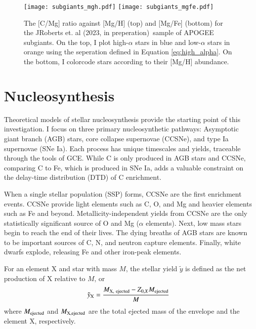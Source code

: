 \documentclass[12pt,oneside]{report}
\newcommand{\citetjack}{JRoberts et. al (2023, in preperation)}
\begin{document}
\begin{figure}[htp]
    \texttt{[image: subgiants\_mgh.pdf]}
    \texttt{[image: subgiants\_mgfe.pdf]}
    \caption[APOGEE Subgiants]{The [C/Mg] ratio against [Mg/H] (top) and [Mg/Fe] (bottom) for the \citetjack~sample of APOGEE subgiants. On the top, I plot high-$\alpha$ stars in blue and low-$\alpha$ stars in orange using the seperation defined in Equation \ref{eq:high_alpha}. On the bottom, I colorcode stars according to their [Mg/H] abundance.}
    \label{fig:subgiants}
\end{figure}
\chapter{Nucleosynthesis}

Theoretical models of stellar nucleosynthesis provide the starting point of this investigation. I focus on three primary nucleosynthetic pathways: Asymptotic giant branch (AGB) stars, core collapse supernovae (CCSNe), and type Ia supernovae (SNe Ia). Each process has unique timescales and yields, traceable through the tools of GCE. While C is only produced in AGB stars and CCSNe, comparing C to Fe, which is produced in SNe Ia, adds a valuable constraint on the delay-time distribution (DTD) of C enrichment.

When a single stellar population (SSP) forms, CCSNe are the first enrichment events. CCSNe provide light elements such as C, O, and Mg and heavier elements such as Fe and beyond. Metallicity-independent yields from CCSNe are the only statistically significant source of O and Mg ($\alpha$ elements). Next, low mass stars begin to reach the end of their lives. The dying breaths of AGB stars are known to be important sources of C, N, and neutron capture elements.  Finally, white dwarfs explode, releasing Fe and other iron-peak elements.


For an element X and star with mass $M$, the stellar yield $\tilde{y}$ is defined as the net production of X relative to $M$, or
\begin{equation}
    \tilde{y}_{\rm X} = \frac{M_{\rm X,\ ejected} - Z_{0, X} M_{\rm ejected}}{M}   
\end{equation}
where $M_{\rm ejected}$ and $M_{\rm X, ejected}$  are the total ejected mass of the envelope and the element X, respectively. 
\end{document}

